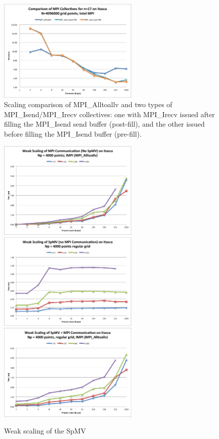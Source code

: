 \documentclass{report}
\begin{document}
\begin{figure}
\centering
\includegraphics[width=0.6\textwidth]{performance_content/scaling/strong_scaling_4M_regular_n17comparison_commOnly.png}
\caption{Scaling comparison of MPI\_Alltoallv and two types of MPI\_Isend/MPI\_Irecv collectives: one with MPI\_Irecv issued after filling the MPI\_Isend send buffer (post-fill), and the other issued before filling the MPI\_Isend buffer (pre-fill).}
\end{figure}

\begin{figure}
\centering
\includegraphics[width=0.6\textwidth]{performance_content/scaling/weak_scaling_np4000_regular_alltoallv_commOnly.png}
\includegraphics[width=0.6\textwidth]{performance_content/scaling/weak_scaling_np4000_regular_spmvOnly.png} 
\includegraphics[width=0.6\textwidth]{performance_content/scaling/weak_scaling_np4000_regular_alltoallv.png}
\caption{Weak scaling of the SpMV}
\end{figure}
\end{document}
